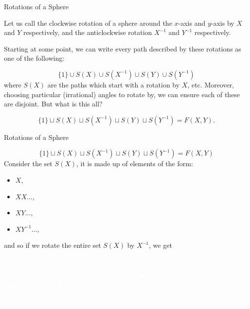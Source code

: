 \documentclass[9pt]{beamer}
\begin{document}
    \begin{frame}{Rotations of a Sphere}

        Let us call the clockwise rotation of a sphere around the $x$-axis and $y$-axis by $X$ and $Y$ respectively, and the anticlockwise rotation $X^{-1}$ and $Y^{-1}$ respectively.

        \pause

        \vspace{24pt}

        Starting at some point, we can write every path described by these rotations as one of the following:

        \[\{1\}\cup S(X)\cup S(X^{-1})\cup S(Y)\cup S(Y^{-1})\]
        where $S(X)$ are the paths which start with a rotation by $X$, etc.
        Moreover, choosing particular (irrational) angles to rotate by, we can ensure each of these are disjoint.
        But what is this all? \pause

        \[\{1\}\sqcup S(X)\sqcup S(X^{-1})\sqcup S(Y)\sqcup S(Y^{-1})=F(X, Y).\]
        
    \end{frame}

    \begin{frame}{Rotations of a Sphere}

        \[\{1\}\sqcup S(X)\sqcup S(X^{-1})\sqcup S(Y)\sqcup S(Y^{-1})=F(X, Y)\]
        Consider the set $S(X)$, it is made up of elements of the form:\pause

        \begin{itemize}
            \item $X$,\pause
            \item $XX\dots$,\pause
            \item $XY\dots$,\pause
            \item $XY^{-1}\dots$,\pause
        \end{itemize}
        and so if we rotate the entire set $S(X)$ by $X^{-1}$, we get

        \[\textcolor{white}{X^{-1}S(X)=\{1\}\sqcup S(X)\sqcup S(Y)\sqcup S(Y^{-1}).}\]
        \textcolor{white}{Not only have we got $S(X)$ in this set, but we have all of $S(Y)$ and $S(Y^{-1})$, and this is in bijection with just $S(X)$... a dupe?
        Similarly}

        \[\textcolor{white}{Y^{-1}S(Y)=\{1\}\sqcup S(Y)\sqcup S(X)\sqcup S(X^{-1}).}\]
        
    \end{frame}
\end{document}
